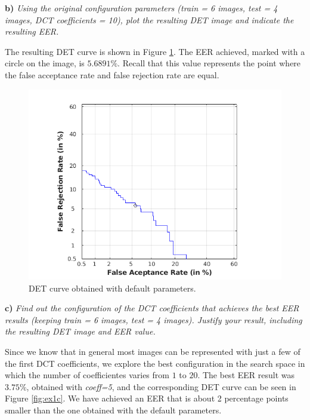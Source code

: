 \documentclass[11pt]{article}
\begin{document}
\textbf{b)} \emph{Using the original configuration parameters (train = 6 images, test = 4 images, DCT coefficients = 10), plot the resulting DET image and indicate the resulting EER.}

The resulting DET curve is shown in Figure \ref{fig:ex1b}. The EER achieved, marked with a circle on the image, is $5.6891\%$. Recall that this value represents the point where the false acceptance rate and false rejection rate are equal.

\begin{figure}[h!]
  \centering
    \includegraphics[scale=0.6]{img/1b_det}
    \caption{DET curve obtained with default parameters.}
    \label{fig:ex1b}
\end{figure}

\textbf{c)} \emph{Find out the configuration of the DCT coefficients that achieves the best EER results (keeping train = 6 images, test = 4 images). Justify your result, including the resulting DET image and EER value.}

Since we know that in general most images can be represented with just a few of the first DCT coefficients, we explore the best configuration in the search space in which the number of coefficientes varies from $1$ to $20$. The best EER result was $3.75\%$, obtained with \textit{coeff=5}, and the corresponding DET curve can be seen in Figure \ref{fig:ex1c}. We have achieved an EER that is about 2 percentage points smaller than the one obtained with the default parameters.
\end{document}
